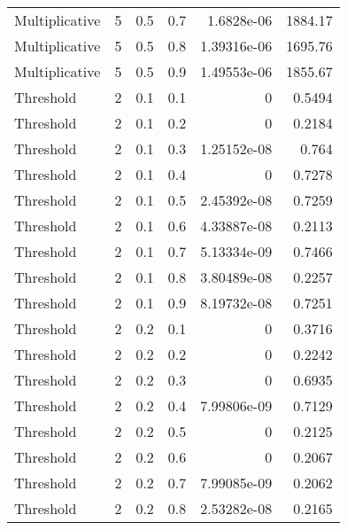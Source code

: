 \documentclass{article}
\begin{document}
\begin{longtable}[H]{lrrrrr}
 Multiplicative &       5 &   0.5 &            0.7 &      1.6828e-06  &       1884.17   \\
 Multiplicative &       5 &   0.5 &            0.8 &      1.39316e-06 &       1695.76   \\
 Multiplicative &       5 &   0.5 &            0.9 &      1.49553e-06 &       1855.67   \\
 Threshold      &       2 &   0.1 &            0.1 &      0           &          0.5494 \\
 Threshold      &       2 &   0.1 &            0.2 &      0           &          0.2184 \\
 Threshold      &       2 &   0.1 &            0.3 &      1.25152e-08 &          0.764  \\
 Threshold      &       2 &   0.1 &            0.4 &      0           &          0.7278 \\
 Threshold      &       2 &   0.1 &            0.5 &      2.45392e-08 &          0.7259 \\
 Threshold      &       2 &   0.1 &            0.6 &      4.33887e-08 &          0.2113 \\
 Threshold      &       2 &   0.1 &            0.7 &      5.13334e-09 &          0.7466 \\
 Threshold      &       2 &   0.1 &            0.8 &      3.80489e-08 &          0.2257 \\
 Threshold      &       2 &   0.1 &            0.9 &      8.19732e-08 &          0.7251 \\
 Threshold      &       2 &   0.2 &            0.1 &      0           &          0.3716 \\
 Threshold      &       2 &   0.2 &            0.2 &      0           &          0.2242 \\
 Threshold      &       2 &   0.2 &            0.3 &      0           &          0.6935 \\
 Threshold      &       2 &   0.2 &            0.4 &      7.99806e-09 &          0.7129 \\
 Threshold      &       2 &   0.2 &            0.5 &      0           &          0.2125 \\
 Threshold      &       2 &   0.2 &            0.6 &      0           &          0.2067 \\
 Threshold      &       2 &   0.2 &            0.7 &      7.99085e-09 &          0.2062 \\
 Threshold      &       2 &   0.2 &            0.8 &      2.53282e-08 &          0.2165 \\

\end{longtable}
\end{document}
